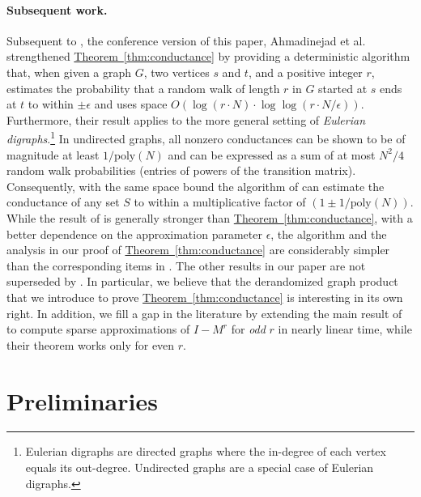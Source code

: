\documentclass[11pt]{article}
\numberwithin{equation}{section}
\theoremstyle{definition}
\theoremstyle{plain}
\newcommand{\expref}[2]{\hyperref[#2]{#1~\ref{#2}}}
\newcommand{\poly}{\mathrm{poly}}
\numberwithin{myalgctr}{section}
\theoremstyle{named}
\begin{document}
\paragraph{Subsequent work.}
Subsequent to \cite{conf-version}, the conference version of this
paper,  
Ahmadinejad et al.  %
\cite{akmpsv19} strengthened \expref{Theorem}{thm:conductance} by providing a deterministic algorithm that, when given a graph $G$, two vertices $s$ and $t$, and a positive integer $r$, estimates the probability that a random walk of length $r$ in $G$ started at $s$ ends at $t$ to within $\pm\epsilon$ and uses space $O(\log (r\cdot N)\cdot\log\log(r\cdot N/\epsilon))$. Furthermore, their result applies to the more general setting of \emph{Eulerian digraphs}.\footnote{Eulerian digraphs are directed graphs where
%
the in-degree of each vertex %
equals its out-degree. Undirected graphs are a special case of Eulerian
%
digraphs.}   %
In undirected graphs, all nonzero conductances can be shown to be of magnitude at least $1/\poly(N)$ and can be expressed as a sum of at most $N^2/4$ random walk probabilities %
%
(entries of powers of the transition matrix). %
Consequently, with the same space bound the algorithm of \cite{akmpsv19} can estimate the conductance of any set $S$ to within a multiplicative factor of $(1\pm 1/\poly(N))$. While the result of \cite{akmpsv19} is generally stronger than \expref{Theorem}{thm:conductance}, with a better dependence on the approximation parameter $\epsilon$, the algorithm and
the   %
analysis in our proof of \expref{Theorem}{thm:conductance}
%
are  %
considerably simpler than
%
the corresponding items in  %
\cite{akmpsv19}. %
%
%
%
The other results in our paper are not superseded by \cite{akmpsv19}. In particular, we believe that the derandomized graph product that we introduce to prove \expref{Theorem}{thm:conductance} is interesting in its own right. In addition, we fill a gap in the literature by extending the main result of \cite{cheng2015} to compute sparse approximations of $I-M^r$ for \emph{odd} $r$ in nearly linear time, while their theorem works only for even $r$.

\section{Preliminaries}
\label{sect:prelims}
%
\end{document}

